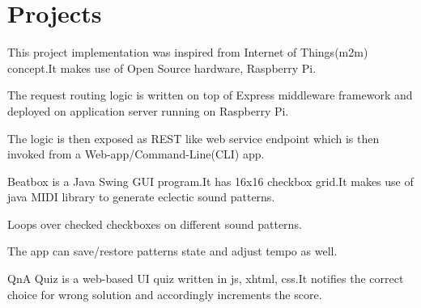 \documentclass[hidelinks]{deedy-resume-openfont}
\renewcommand{\sectionsep}[0]{\vspace{8pt}}
\begin{document}
\begin{minipage}[t]{0.66\textwidth}

\section{Projects}
\descript{}
\begin{tightemize}
\item This project implementation was inspired from Internet of Things(m2m)
  concept.It makes use of Open Source hardware, Raspberry Pi.
\item The request routing logic is written on top of Express middleware
  framework and deployed on application server running on
  Raspberry Pi.
\item The logic is then exposed as REST like web service endpoint which is then
  invoked from a Web-app/Command-Line(CLI) app.
\end{tightemize}
\sectionsep

\descript{}
\begin{tightemize}
\item Beatbox is a Java Swing GUI program.It has 16x16 checkbox grid.It makes
  use of java MIDI library to generate eclectic sound patterns.
\item Loops over checked checkboxes on different sound patterns.
\item The app can save/restore patterns state and adjust tempo as well.
\end{tightemize}
\sectionsep

\descript{}
\begin{tightemize}
\item QnA Quiz is a web-based UI quiz written in js, xhtml, css.It notifies
  the correct choice for wrong solution and accordingly increments the score.
\end{tightemize}
\sectionsep


\end{minipage}
\end{document}
